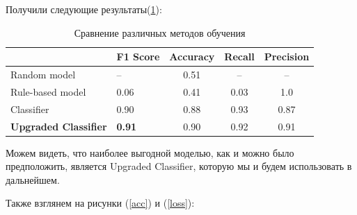 \documentclass[14pt]{matmex-diploma}
\begin{document}
        Получили следующие результаты(\ref{graph}):
        
        \begin{table}[h]
            \centering
            \begin{tabular}{|l|l|c|c|c|}
            \hline
                                         & F1 Score      & Accuracy & Recall & Precision \\ \hline
            Random model                 & –             & 0.51     & –      & –         \\ \hline
            Rule-based model             & 0.06          & 0.41     & 0.03   & 1.0       \\ \hline
            Classifier                   & 0.90          & 0.88     & 0.93   & 0.87      \\ \hline
            \textbf{Upgraded Classifier} & \textbf{0.91} & 0.90     & 0.92   & 0.91      \\ \hline
            \end{tabular}
            \caption{Сравнение различных методов обучения}
            \label{graph}
        \end{table}
        
        Можем видеть, что наиболее выгодной моделью, как и можно было предположить, является Upgraded Classifier, 
        которую мы и будем использовать в дальнейшем.
        
        Также взглянем на рисунки (\ref{acc}) и (\ref{loss}):
        
\end{document}
